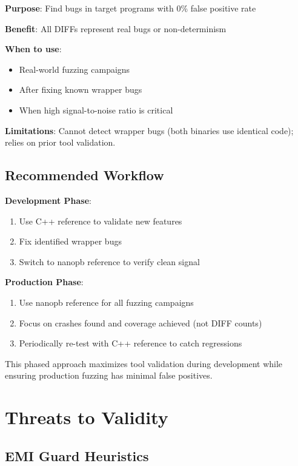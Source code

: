 \documentclass[doublespace,nopageskip]{VTthesis}
\begin{document}
\textbf{Purpose}: Find bugs in target programs with 0\% false positive rate

\textbf{Benefit}: All DIFFs represent real bugs or non-determinism

\textbf{When to use}:
\begin{itemize}
    \item Real-world fuzzing campaigns
    \item After fixing known wrapper bugs
    \item When high signal-to-noise ratio is critical
\end{itemize}

\textbf{Limitations}: Cannot detect wrapper bugs (both binaries use identical code); relies on prior tool validation.

\subsection{Recommended Workflow}

\textbf{Development Phase}:
\begin{enumerate}
    \item Use C++ reference to validate new features
    \item Fix identified wrapper bugs
    \item Switch to nanopb reference to verify clean signal
\end{enumerate}

\textbf{Production Phase}:
\begin{enumerate}
    \item Use nanopb reference for all fuzzing campaigns
    \item Focus on crashes found and coverage achieved (not DIFF counts)
    \item Periodically re-test with C++ reference to catch regressions
\end{enumerate}

This phased approach maximizes tool validation during development while ensuring production fuzzing has minimal false positives.

\section{Threats to Validity} \label{se:threats_validity}

\subsection{EMI Guard Heuristics}
\end{document}
